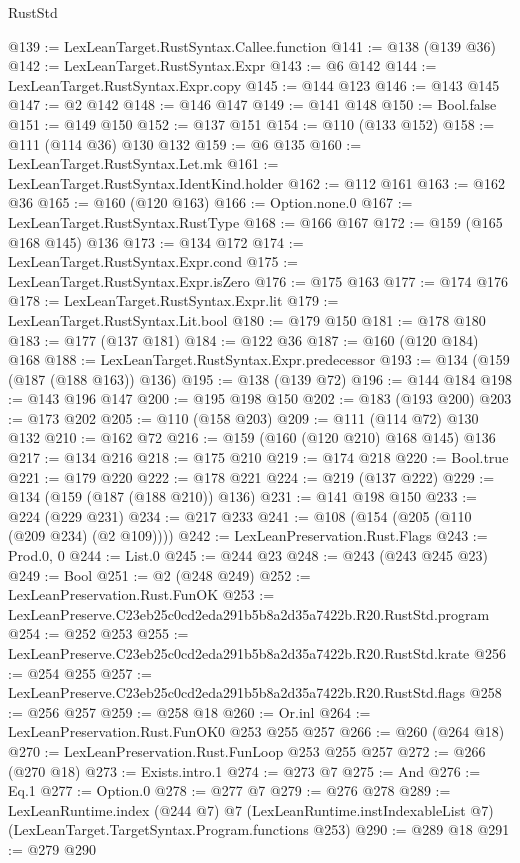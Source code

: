 \begin{lexlean}{RustStd}
\begin{coremodule}
@139 := LexLeanTarget.RustSyntax.Callee.function
@141 := @138 (@139 @36)
@142 := LexLeanTarget.RustSyntax.Expr
@143 := @6 @142
@144 := LexLeanTarget.RustSyntax.Expr.copy
@145 := @144 @123
@146 := @143 @145
@147 := @2 @142
@148 := @146 @147
@149 := @141 @148
@150 := Bool.false
@151 := @149 @150
@152 := @137 @151
@154 := @110 (@133 @152)
@158 := @111 (@114 @36) @130 @132
@159 := @6 @135
@160 := LexLeanTarget.RustSyntax.Let.mk
@161 := LexLeanTarget.RustSyntax.IdentKind.holder
@162 := @112 @161
@163 := @162 @36
@165 := @160 (@120 @163)
@166 := Option.none.{0}
@167 := LexLeanTarget.RustSyntax.RustType
@168 := @166 @167
@172 := @159 (@165 @168 @145) @136
@173 := @134 @172
@174 := LexLeanTarget.RustSyntax.Expr.cond
@175 := LexLeanTarget.RustSyntax.Expr.isZero
@176 := @175 @163
@177 := @174 @176
@178 := LexLeanTarget.RustSyntax.Expr.lit
@179 := LexLeanTarget.RustSyntax.Lit.bool
@180 := @179 @150
@181 := @178 @180
@183 := @177 (@137 @181)
@184 := @122 @36
@187 := @160 (@120 @184) @168
@188 := LexLeanTarget.RustSyntax.Expr.predecessor
@193 := @134 (@159 (@187 (@188 @163)) @136)
@195 := @138 (@139 @72)
@196 := @144 @184
@198 := @143 @196 @147
@200 := @195 @198 @150
@202 := @183 (@193 @200)
@203 := @173 @202
@205 := @110 (@158 @203)
@209 := @111 (@114 @72) @130 @132
@210 := @162 @72
@216 := @159 (@160 (@120 @210) @168 @145) @136
@217 := @134 @216
@218 := @175 @210
@219 := @174 @218
@220 := Bool.true
@221 := @179 @220
@222 := @178 @221
@224 := @219 (@137 @222)
@229 := @134 (@159 (@187 (@188 @210)) @136)
@231 := @141 @198 @150
@233 := @224 (@229 @231)
@234 := @217 @233
@241 := @108 (@154 (@205 (@110 (@209 @234) (@2 @109))))
@242 := LexLeanPreservation.Rust.Flags
@243 := Prod.{0, 0}
@244 := List.{0}
@245 := @244 @23
@248 := @243 (@243 @245 @23)
@249 := Bool
@251 := @2 (@248 @249)
@252 := LexLeanPreservation.Rust.FunOK
@253 := LexLeanPreserve.C23eb25c0cd2eda291b5b8a2d35a7422b.R20.RustStd.program
@254 := @252 @253
@255 := LexLeanPreserve.C23eb25c0cd2eda291b5b8a2d35a7422b.R20.RustStd.krate
@256 := @254 @255
@257 := LexLeanPreserve.C23eb25c0cd2eda291b5b8a2d35a7422b.R20.RustStd.flags
@258 := @256 @257
@259 := @258 @18
@260 := Or.inl
@264 := LexLeanPreservation.Rust.FunOK0 @253 @255 @257
@266 := @260 (@264 @18)
@270 := LexLeanPreservation.Rust.FunLoop @253 @255 @257
@272 := @266 (@270 @18)
@273 := Exists.intro.{1}
@274 := @273 @7
@275 := And
@276 := Eq.{1}
@277 := Option.{0}
@278 := @277 @7
@279 := @276 @278
@289 := LexLeanRuntime.index
    (@244 @7)
    @7
    (LexLeanRuntime.instIndexableList @7)
    (LexLeanTarget.TargetSyntax.Program.functions @253)
@290 := @289 @18
@291 := @279 @290

\end{coremodule}
\end{lexlean}
